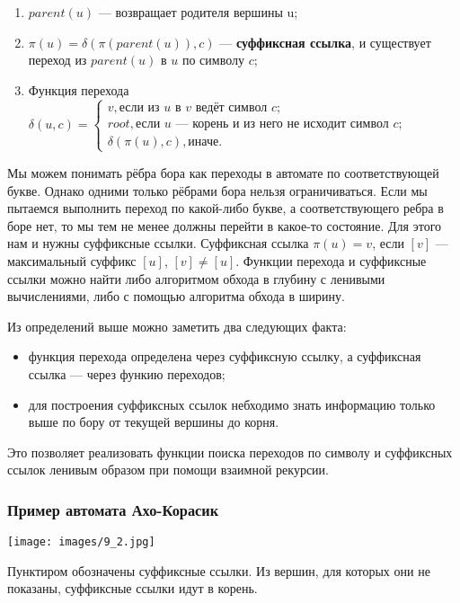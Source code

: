 \begin{enumerate}
    \item $parent(u)$ — возвращает родителя вершины u;
    \item $\pi(u)=\delta(\pi(parent(u)),c)$ --- \textbf{суффиксная ссылка}, и существует переход из $parent(u)$ в $u$ по символу $c$;
    \item Функция перехода $\delta(u, c)=\begin{cases}
    v, \text{если из $u$ в $v$ ведёт символ $c$};\\
    root, \text{если $u$ --- корень и из него не исходит символ $c$};\\
    \delta(\pi(u), c), \text{иначе}.
    \end{cases}$
\end{enumerate}

Мы можем понимать рёбра бора как переходы в автомате по соответствующей букве.
Однако одними только рёбрами бора нельзя ограничиваться.
Если мы пытаемся выполнить переход по какой-либо букве, а соответствующего ребра в боре нет, то мы тем не менее должны перейти в какое-то состояние.
Для этого нам и нужны суффиксные ссылки.
Суффиксная ссылка $\pi(u)=v$, если $[v]$ --- максимальный суффикс $[u]$, $[v]\not=[u]$.
Функции перехода и суффиксные ссылки можно найти либо алгоритмом обхода в глубину с ленивыми вычислениями, либо с помощью алгоритма обхода в ширину. 

Из определений выше можно заметить два следующих факта:

\begin{itemize}
    \item функция перехода определена через суффиксную ссылку, а суффиксная ссылка — через функию переходов;
    \item для построения суффиксных ссылок небходимо знать информацию только выше по бору от текущей вершины до корня.
\end{itemize}

Это позволяет реализовать функции поиска переходов по символу и суффиксных ссылок ленивым образом при помощи взаимной рекурсии.

\subsubsection{Пример автомата Ахо-Корасик}

\texttt{[image: images/9\_2.jpg]}

Пунктиром обозначены суффиксные ссылки.
Из вершин, для которых они не показаны, суффиксные ссылки идут в корень.

